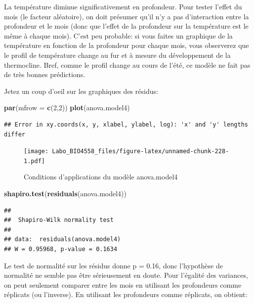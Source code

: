 \documentclass[12pt,]{book}
\newenvironment{Shaded}{\begin{snugshade}}{\end{snugshade}}
\newcommand{\DataTypeTok}[1]{\textcolor[rgb]{0.13,0.29,0.53}{#1}}
\newcommand{\DecValTok}[1]{\textcolor[rgb]{0.00,0.00,0.81}{#1}}
\newcommand{\KeywordTok}[1]{\textcolor[rgb]{0.13,0.29,0.53}{\textbf{#1}}}
\newcommand{\NormalTok}[1]{#1}
\begin{document}
La température diminue significativement en profondeur. Pour tester l'effet du mois (le facteur aléatoire), on doit présumer qu'il n'y a pas d'interaction entre la profondeur et le mois (donc que l'effet de la profondeur sur la température est le même à chaque mois). C'est peu probable: si vous faites un graphique de la température en fonction de la profondeur pour chaque mois, vous observerez que le profil de température change au fur et à mesure du développement de la thermocline. Bref, comme le profil change au cours de l'été, ce modèle ne fait pas de très bonnes prédictions.

Jetez un coup d'oeil sur les graphiques des résidus:

\begin{Shaded}
\begin{Highlighting}[]
\KeywordTok{par}\NormalTok{(}\DataTypeTok{mfrow =} \KeywordTok{c}\NormalTok{(}\DecValTok{2}\NormalTok{,}\DecValTok{2}\NormalTok{))}
\KeywordTok{plot}\NormalTok{(anova.model4)}
\end{Highlighting}
\end{Shaded}

\begin{verbatim}
## Error in xy.coords(x, y, xlabel, ylabel, log): 'x' and 'y' lengths differ
\end{verbatim}

\begin{figure}
\centering
\texttt{[image: Labo\_BIO4558\_files/figure-latex/unnamed-chunk-228-1.pdf]}
\caption{\label{fig:unnamed-chunk-228}Conditions d'applications du modèle anova.model4}
\end{figure}

\begin{Shaded}
\begin{Highlighting}[]
\KeywordTok{shapiro.test}\NormalTok{(}\KeywordTok{residuals}\NormalTok{(anova.model4))}
\end{Highlighting}
\end{Shaded}

\begin{verbatim}
## 
##  Shapiro-Wilk normality test
## 
## data:  residuals(anova.model4)
## W = 0.95968, p-value = 0.1634
\end{verbatim}

Le test de normalité sur les résidus donne p = 0.16, donc l'hypothèse de normalité ne semble pas être sérieusement en doute. Pour l'égalité des variances, on peut seulement comparer entre les mois en utilisant les profondeurs comme réplicats (ou l'inverse). En utilisant les profondeurs comme réplicats, on obtient:
\end{document}
